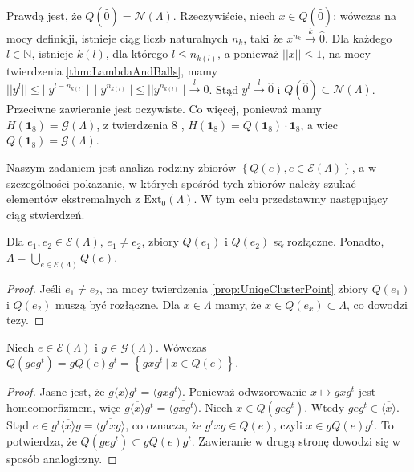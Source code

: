 {\begin{Remark}
    \label{rem:Qof1}
Prawdą jest, że $Q(\hat{0}) = \mathcal{N}(\Lambda)$.
Rzeczywiście, niech $x \in Q(\hat{0})$;
wówczas na mocy definicji,
istnieje ciąg liczb naturalnych $n_{k}$, taki że
$x^{n_{k}} \overset{k}{\rightarrow} \hat{0}$.
Dla każdego $l \in \mathbb{N}$, istnieje $k(l)$, dla którego
$l \leq n_{k(l)}$, a ponieważ
$||x|| \leq 1 $, na mocy twierdzenia \ref{thm:LambdaAndBalls}, mamy
$||y^{l}|| \leq ||y^{l - n_{k(l)}}|| \, ||y^{n_{k(l)}}|| \leq ||y^{n_{k(l)}}||
\overset{l}{\rightarrow} 0$.
Stąd $y^{l} \overset{l}{\rightarrow} \hat{0}$
i $Q(\hat{0}) \subset \mathcal{N}(\Lambda)$.
Przeciwne zawieranie jest oczywiste.
Co więcej, ponieważ mamy $H(\mathbf{1}_{8}) = \mathcal{G}(\Lambda)$,
z twierdzenia 8 \cite{schwarz1955hausdorff},
$H(\mathbf{1}_{8}) = Q(\mathbf{1}_{8}) \cdot \mathbf{1}_{8}$,
a wiec $Q(\mathbf{1}_{8}) = \mathcal{G}(\Lambda)$.
\end{Remark}

Naszym zadaniem jest analiza rodziny zbiorów
$\left \{ Q(e), e \in \mathcal{E}(\Lambda) \right \}$,
a w szczególności pokazanie, w których spośród tych zbiorów należy szukać
elementów ekstremalnych z
$\text{Ext}_{0}(\Lambda)$.
W tym celu przedstawmy następujący ciąg stwierdzeń.

\begin{Theorem}
    Dla $e_{1}, e_{2} \in \mathcal{E}(\Lambda)$,
    $e_{1} \neq e_{2}$,
    zbiory $Q(e_{1})$ i $Q(e_{2})$ są rozłączne.
Ponadto,
    $\Lambda = \! \bigcup \limits_{e \in \mathcal{E}(\Lambda)} \! Q(e)$.
\end{Theorem}
\begin{proof}
Jeśli $e_{1} \neq e_{2}$, na mocy twierdzenia \ref{prop:UniqeClusterPoint}
zbiory $Q(e_{1})$ i $Q(e_{2})$ muszą być rozłączne.
Dla $x \in \Lambda$ mamy, że $x \in Q(e_{x}) \subset \Lambda$,
co dowodzi tezy.
\end{proof}

\begin{Lemma}
    \label{lem:equivClassesOfQe}
    Niech $e \in \mathcal{E}(\Lambda)$ i $g \in \mathcal{G}(\Lambda)$.
    Wówczas $Q(g e g^{t}) = g Q(e) g^{t} =
    \left \{ g x g^{t} \: | \: x \in Q(e) \right \}$.
\end{Lemma}
\begin{proof}
    Jasne jest, że $g \langle x \rangle g^{t} = \langle g x g^{t} \rangle$.
Ponieważ odwzorowanie $x \mapsto g x g^{t}$ jest homeomorfizmem,
więc $g \overline{\langle x \rangle} g^{t} = \overline{\langle g x g^{t} \rangle}$.
Niech $x \in Q(g e g^{t})$.
Wtedy $g e g^{t} \in \overline{\langle x \rangle}$.
Stąd $e \in g^{t} \overline{\langle x \rangle} g = \overline{\langle g^{t} x g \rangle}$,
co oznacza, że $g^{t} x g \in Q(e)$, czyli
    $x \in g Q(e) g^{t}$.
To potwierdza, że
    $Q(g e g^{t}) \subset g Q(e) g^{t}$.
Zawieranie w drugą stronę dowodzi się w sposób analogiczny.
\end{proof}

}
